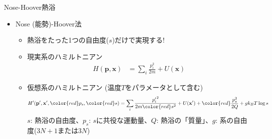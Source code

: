 
\begin{frame}[t,fragile]{Nose-Hoover熱浴}
  \begin{itemize}
  \item Nose (能勢)-Hoover法
    \begin{itemize}
    \item 熱浴をたった1つの自由度($s$)だけで実現する!
    \item 現実系のハミルトニアン
      \begin{align*}
        H(\mathbf{p},\mathbf{x}) &= \sum_i \frac{p_i^2}{2m} + U(\mathbf{x})
      \end{align*}
    \item 仮想系のハミルトニアン (温度$T$をパラメータとして含む)
      \begin{align*}
        H'(\mathbf{p}',\mathbf{x}',{\color{red}p_s},{\color{red}s}) &= \sum_i \frac{{p'_i}^2}{2m{\color{red}s^2}} + U(\mathbf{x}') + {\color{red}\frac{p_s^2}{2Q} + g k_B T\log s}
      \end{align*}
      $s$: 熱浴の自由度、$p_s$: $s$に共役な運動量、$Q$: 熱浴の「質量」、$g$: 系の自由度($3N+1$または$3N$)
    \end{itemize}
  \end{itemize}
\end{frame}

